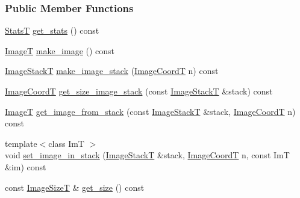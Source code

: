 \subsubsection*{Public Member Functions}
\begin{DoxyCompactItemize}
\item 
\hyperlink{namespacemappel_a04ab395b0cf82c4ce68a36b2212649a5}{StatsT} \hyperlink{classmappel_1_1ImageFormat2DBase_a1a1e1178943bee139617b6c25e5104f1}{get\+\_\+stats} () const 
\item 
\hyperlink{classmappel_1_1ImageFormat2DBase_a667ea5016648958e507e7db8eaa041b0}{ImageT} \hyperlink{classmappel_1_1ImageFormat2DBase_ab5d6c4f7f3818f4652fcf8d54351c981}{make\+\_\+image} () const 
\item 
\hyperlink{classmappel_1_1ImageFormat2DBase_a8f0276e94ff242fa4740a718642f5e14}{Image\+StackT} \hyperlink{classmappel_1_1ImageFormat2DBase_a76f8b347ce6c104973dec235398a4f32}{make\+\_\+image\+\_\+stack} (\hyperlink{classmappel_1_1ImageFormat2DBase_a45e9234d63c357f34ca56c72c12b9e9c}{Image\+CoordT} n) const 
\item 
\hyperlink{classmappel_1_1ImageFormat2DBase_a45e9234d63c357f34ca56c72c12b9e9c}{Image\+CoordT} \hyperlink{classmappel_1_1ImageFormat2DBase_a8ac2ce73a9b353b92a688224ccc4d217}{get\+\_\+size\+\_\+image\+\_\+stack} (const \hyperlink{classmappel_1_1ImageFormat2DBase_a8f0276e94ff242fa4740a718642f5e14}{Image\+StackT} \&stack) const 
\item 
\hyperlink{classmappel_1_1ImageFormat2DBase_a667ea5016648958e507e7db8eaa041b0}{ImageT} \hyperlink{classmappel_1_1ImageFormat2DBase_a22701571228f52dd6cfeac72ab18908c}{get\+\_\+image\+\_\+from\+\_\+stack} (const \hyperlink{classmappel_1_1ImageFormat2DBase_a8f0276e94ff242fa4740a718642f5e14}{Image\+StackT} \&stack, \hyperlink{classmappel_1_1ImageFormat2DBase_a45e9234d63c357f34ca56c72c12b9e9c}{Image\+CoordT} n) const 
\item 
{\footnotesize template$<$class ImT $>$ }\\void \hyperlink{classmappel_1_1ImageFormat2DBase_aaae78a9b02452eb3538af34fcdcc3ad2}{set\+\_\+image\+\_\+in\+\_\+stack} (\hyperlink{classmappel_1_1ImageFormat2DBase_a8f0276e94ff242fa4740a718642f5e14}{Image\+StackT} \&stack, \hyperlink{classmappel_1_1ImageFormat2DBase_a45e9234d63c357f34ca56c72c12b9e9c}{Image\+CoordT} n, const ImT \&im) const 
\item 
const \hyperlink{classmappel_1_1ImageFormat2DBase_a49cccf61eb2a768a202634d27fcd81d5}{Image\+SizeT} \& \hyperlink{classmappel_1_1ImageFormat2DBase_a4497fe096f82ccb3af3c3632921081a5}{get\+\_\+size} () const 

\end{DoxyCompactItemize}
